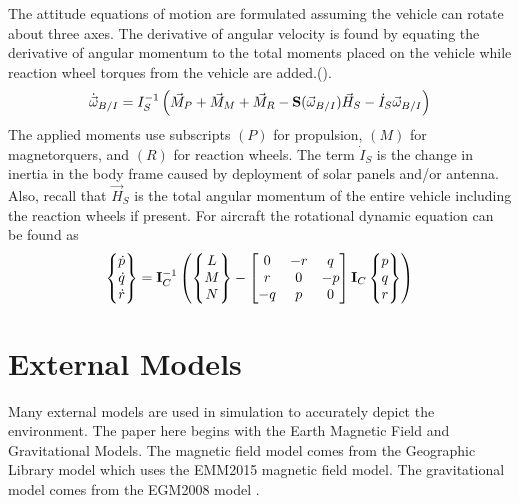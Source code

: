 \documentclass{article}
\begin{document}
The attitude equations of motion are formulated assuming the vehicle
can rotate about three axes. The derivative of
angular velocity is found by equating the derivative of angular momentum
to the total moments placed on the vehicle while reaction wheel
torques from the vehicle are added.(\cite{etkins}).
\begin{equation}\label{e:pqrdot}
  \dot{\vec{\omega}}_{B/I} = I_S^{-1}\left( \vec{M}_P + \vec{M}_{M} +
  \vec{M}_R - {\bf S}(\vec{\omega}_{B/I}) \vec{H}_{S} - \dot{I}_S\vec{\omega}_{B/I}\right)
\end{equation}
The applied moments use subscripts $(P)$ for propulsion, $(M)$ for
magnetorquers, and $(R)$ for reaction wheels. The term $\dot{I}_S$ is the change in
inertia in the body frame caused by deployment of solar panels and/or
antenna. Also, recall that $\vec{H}_S$ is the total angular momentum
of the entire vehicle including the reaction wheels if present. For
aircraft the rotational dynamic equation can be found as
\begin{equation}\label{e:pqrdot} 
\begin{Bmatrix} \dot{p} \\ \dot{q} \\ \dot{r} \end{Bmatrix} = {\bf I}_C^{-1}\left(
\begin{Bmatrix} L\\M\\N\end{Bmatrix}-\begin{bmatrix} 0 & -r
& q \\ r & 0 & -p \\ -q & p & 0 \end{bmatrix} {\bf I}_C\begin{Bmatrix} p\\q\\r\end{Bmatrix}\right)
\end{equation}

\section{External Models}

Many external models are used in simulation to accurately depict the
environment. The paper here begins with the Earth Magnetic Field
and Gravitational Models. The magnetic field model comes from the Geographic
Library model which uses the EMM2015 magnetic field model. The
gravitational model comes from the EGM2008 model
\cite{GeographicLib}.
\end{document}
